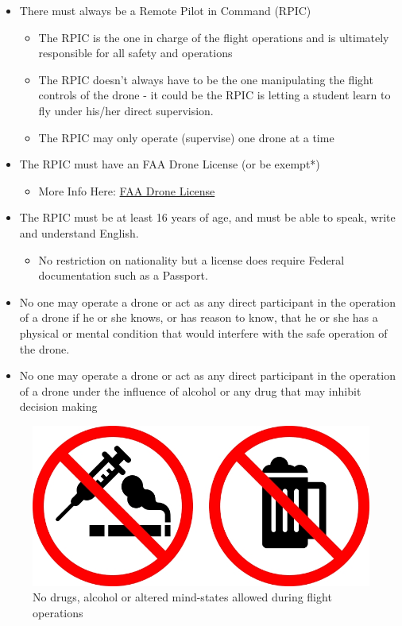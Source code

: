 \documentclass[
  12pt,
]{book}
\providecommand{\tightlist}{%
  \setlength{\itemsep}{0pt}\setlength{\parskip}{0pt}}
\begin{document}
\begin{itemize}
\tightlist
\item
  There must always be a Remote Pilot in Command (RPIC)

  \begin{itemize}
  \tightlist
  \item
    The RPIC is the one in charge of the flight operations and is ultimately responsible for all safety and operations
  \item
    The RPIC doesn't always have to be the one manipulating the flight controls of the drone - it could be the RPIC is letting a student learn to fly under his/her direct supervision.
  \item
    The RPIC may only operate (supervise) one drone at a time
  \end{itemize}
\item
  The RPIC must have an FAA Drone License (or be exempt*)

  \begin{itemize}
  \tightlist
  \item
    More Info Here: \protect\hyperlink{ch-license}{FAA Drone License}
  \end{itemize}
\item
  The RPIC must be at least 16 years of age, and must be able to speak, write and understand English.

  \begin{itemize}
  \tightlist
  \item
    No restriction on nationality but a license does require Federal documentation such as a Passport.
  \end{itemize}
\item
  No one may operate a drone or act as any direct participant in the operation of a drone if he or she knows, or has reason to know, that he or she has a physical or mental condition that would interfere with the safe operation of the drone.
\item
  No one may operate a drone or act as any direct participant in the operation of a drone under the influence of alcohol or any drug that may inhibit decision making
\end{itemize}

\begin{figure}

{\centering \includegraphics[width=0.7\linewidth]{images/no_drugs} 

}

\caption{No drugs, alcohol or altered mind-states allowed during flight operations}\label{fig:drugs}
\end{figure}
\end{document}
